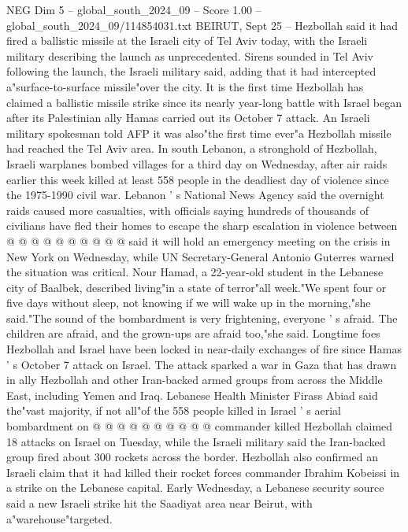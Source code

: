\begin{textsample}{NEG Dim 5 – global\_south\_2024\_09 – Score 1.00 – global\_south\_2024\_09/114854031.txt}  \label{ex:f5_neg_222}
BEIRUT, Sept 25 -- Hezbollah said it had fired a ballistic missile at the Israeli city of Tel Aviv today, with the Israeli military describing the launch as unprecedented.
Sirens sounded in Tel Aviv following the launch, the Israeli military said, adding that it had intercepted a"surface-to-surface missile"over the city.
It is the first time Hezbollah has claimed a ballistic missile strike since its nearly year-long battle with Israel began after its Palestinian ally Hamas carried out its October 7 attack.
An Israeli military spokesman told AFP it was also"the first time ever"a Hezbollah missile had reached the Tel Aviv area.
In south Lebanon, a stronghold of Hezbollah, Israeli warplanes bombed villages for a third day on Wednesday, after air raids earlier this week killed at least 558 people in the deadliest day of violence since the 1975-1990 civil war.
Lebanon ' s National News Agency said the overnight raids caused more casualties, with officials saying hundreds of thousands of civilians have fled their homes to escape the sharp escalation in violence between @ @ @ @ @ @ @ @ @ @ said it will hold an emergency meeting on the crisis in New York on Wednesday, while UN Secretary-General Antonio Guterres warned the situation was critical.
Nour Hamad, a 22-year-old student in the Lebanese city of Baalbek, described living"in a state of terror"all week."We spent four or five days without sleep, not knowing if we will wake up in the morning,"she said."The sound of the bombardment is very frightening, everyone ' s afraid.
The children are afraid, and the grown-ups are afraid too,"she said.
Longtime foes Hezbollah and Israel have been locked in near-daily exchanges of fire since Hamas ' s October 7 attack on Israel.
The attack sparked a war in Gaza that has drawn in ally Hezbollah and other Iran-backed armed groups from across the Middle East, including Yemen and Iraq.
Lebanese Health Minister Firass Abiad said the"vast majority, if not all"of the 558 people killed in Israel ' s aerial bombardment on @ @ @ @ @ @ @ @ @ @ commander killed Hezbollah claimed 18 attacks on Israel on Tuesday, while the Israeli military said the Iran-backed group fired about 300 rockets across the border.
Hezbollah also confirmed an Israeli claim that it had killed their rocket forces commander Ibrahim Kobeissi in a strike on the Lebanese capital.
Early Wednesday, a Lebanese security source said a new Israeli strike hit the Saadiyat area near Beirut, with a"warehouse"targeted.

\end{textsample}
